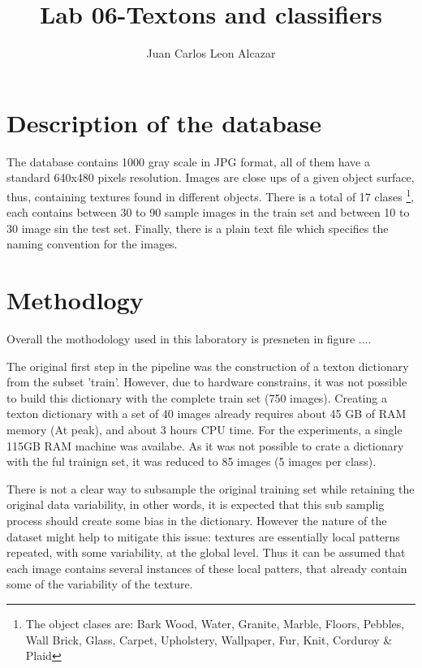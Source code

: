 \documentclass[a4paper]{article}
\title{Lab 06-Textons and classifiers}
\author{Juan Carlos Leon Alcazar}
\begin{document}
\maketitle

\section{Description of the database}

The database\cite{Lazebnik2005} contains 1000 gray scale in JPG format, all of them have a standard 640x480 pixels resolution. Images are close ups of a given object surface, thus, containing textures found in different objects. There is a total of 17 clases \footnote{The object clases are: Bark Wood, Water, Granite, Marble, Floors, Pebbles, Wall Brick, Glass, Carpet, Upholstery, Wallpaper, Fur, Knit, Corduroy \& Plaid }, each contains between 30 to 90 sample images in the train set and between 10 to 30 image sin the test set. Finally, there is a plain text file which specifies the naming convention for the images.


\section{Methodlogy}

Overall the mothodology used in this laboratory is presneten in figure .... 



The original first step in the pipeline was the construction of a texton dictionary from the subset 'train'.  However, due to hardware constrains, it was not possible to build this dictionary with the complete train set (750 images). Creating a texton dictionary with a set of 40 images already requires about 45 GB of RAM memory (At peak), and about 3 hours CPU time. For the experiments, a single 115GB RAM machine was availabe. As it was not possible to crate a dictionary with the ful trainign set, it was reduced to 85 images (5 images per class). 

There is not a clear way to subsample the original training set while retaining the original data variability, in other words, it is expected that this sub samplig process should create some bias in the dictionary. However the nature of the dataset might help to mitigate this issue: textures are essentially local patterns repeated, with some variability, at the global level. Thus it can be assumed that each image contains several instances of these local patters, that already contain some of the variability of the texture.
\end{document}
